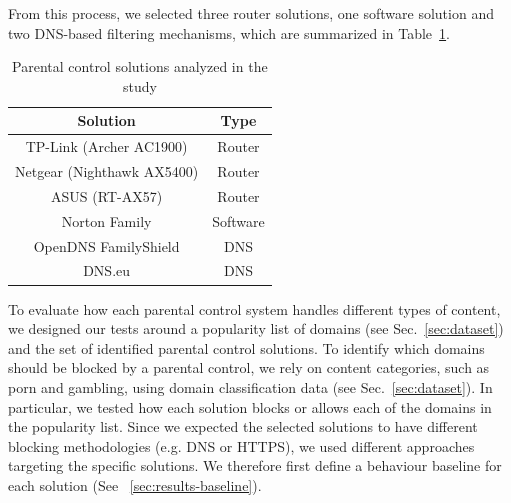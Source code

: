 From this process, we selected three router solutions, one software solution and two DNS-based filtering mechanisms, which are summarized in Table~\ref{tab:parental_controls}.

\begin{table}[htbp]
	\centering
    \begin{tabular}{|c|c|}
    \hline
    \textbf{Solution} & \textbf{Type} \\
    \hline
    TP-Link (Archer AC1900) & Router \\
    \hline
    Netgear (Nighthawk AX5400) & Router \\
    \hline
    ASUS (RT-AX57) & Router \\
    \hline
    Norton Family & Software \\
    \hline
    OpenDNS FamilyShield & DNS \\
    \hline
    DNS.eu & DNS \\
    \hline
    \end{tabular}
    \vspace{0.5\baselineskip} 
    \caption{Parental control solutions analyzed in the study}
    \label{tab:parental_controls}
\end{table}
    
    


To evaluate how each parental control system handles different types of content, we 
designed our tests around a popularity list of domains (see Sec.~\ref{sec:dataset}) and the set of identified parental control solutions. To identify which domains should be blocked by a parental control, we rely on content categories, such as porn and gambling, using domain classification data (see Sec.~\ref{sec:dataset}).
In particular, we tested how each solution blocks or allows each of the domains in the popularity list. Since we expected the selected solutions to have different blocking methodologies (e.g. DNS or HTTPS), we used different approaches targeting the specific solutions. We therefore first define a behaviour baseline for each solution (See ~\ref{sec:results-baseline}).


